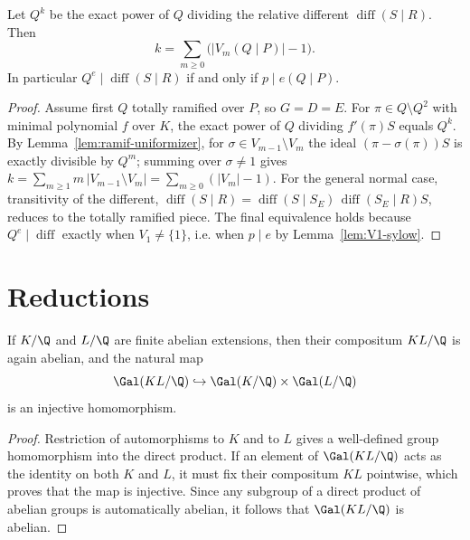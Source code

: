 \begin{theorem}
  \label{thm:hilbert-formula}
  Let $Q^k$ be the exact power of $Q$ dividing the relative different
  $\operatorname{diff}(S \mid R)$. Then
  \[
    k = \sum_{m \ge 0} \bigl(|V_m(Q \mid P)| - 1\bigr).
  \]
  In particular $Q^{e} \mid \operatorname{diff}(S \mid R)$ if and only if
  $p \mid e(Q \mid P)$.
\end{theorem}
\begin{proof}
  Assume first $Q$ totally ramified over $P$, so $G = D = E$. For $\pi \in Q
  \setminus Q^2$ with minimal polynomial $f$ over $K$, the exact power of $Q$
  dividing $f'(\pi)S$ equals $Q^k$. By Lemma~\ref{lem:ramif-uniformizer}, for
  $\sigma \in V_{m-1} \setminus V_m$ the ideal $(\pi - \sigma(\pi))S$ is exactly
  divisible by $Q^m$; summing over $\sigma \neq 1$ gives $k = \sum_{m \ge 1} m
  \,|V_{m-1} \setminus V_m| = \sum_{m \ge 0}(|V_m| - 1)$. For the general normal
  case, transitivity of the different,
  $\operatorname{diff}(S \mid R) = \operatorname{diff}(S \mid S_E)\,
  \operatorname{diff}(S_E \mid R)S$, reduces to the totally ramified piece. The
  final equivalence holds because $Q^e \mid \operatorname{diff}$ exactly when
  $V_1 \neq \{1\}$, i.e. when $p \mid e$ by Lemma~\ref{lem:V1-sylow}.
\end{proof}

\section{Reductions}

\begin{lemma}
  \label{lem:composite-abelian}
  If $K/\Q$ and $L/\Q$ are finite abelian extensions, then their compositum
  $KL/\Q$ is again abelian, and the natural map
  \[
    \Gal(KL/\Q) \hookrightarrow \Gal(K/\Q) \times \Gal(L/\Q)
  \]
  is an injective homomorphism.
\end{lemma}
\begin{proof}
  Restriction of automorphisms to $K$ and to $L$ gives a well-defined group
  homomorphism into the direct product. If an element of $\Gal(KL/\Q)$ acts as
  the identity on both $K$ and $L$, it must fix their compositum $KL$
  pointwise, which proves that the map is injective. Since any subgroup of a
  direct product of abelian groups is automatically abelian, it follows that
  $\Gal(KL/\Q)$ is abelian.
\end{proof}

